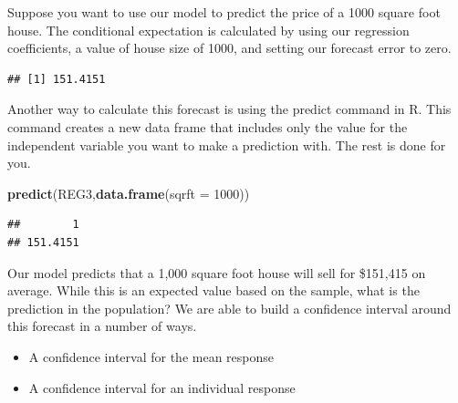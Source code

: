 \documentclass[
]{book}
\newenvironment{Shaded}{\begin{snugshade}}{\end{snugshade}}
\newcommand{\AttributeTok}[1]{\textcolor[rgb]{0.13,0.29,0.53}{#1}}
\newcommand{\DecValTok}[1]{\textcolor[rgb]{0.00,0.00,0.81}{#1}}
\newcommand{\FunctionTok}[1]{\textcolor[rgb]{0.13,0.29,0.53}{\textbf{#1}}}
\newcommand{\NormalTok}[1]{#1}
\newcommand{\OtherTok}[1]{\textcolor[rgb]{0.56,0.35,0.01}{#1}}
\newcommand{\SpecialCharTok}[1]{\textcolor[rgb]{0.81,0.36,0.00}{\textbf{#1}}}
\begin{document}
Suppose you want to use our model to predict the price of a 1000 square foot house. The conditional expectation is calculated by using our regression coefficients, a value of house size of 1000, and setting our forecast error to zero.

\begin{Shaded}
\end{Shaded}

\begin{verbatim}
## [1] 151.4151
\end{verbatim}

Another way to calculate this forecast is using the predict command in R. This command creates a new data frame that includes only the value for the independent variable you want to make a prediction with. The rest is done for you.

\begin{Shaded}
\begin{Highlighting}[]
\FunctionTok{predict}\NormalTok{(REG3,}\FunctionTok{data.frame}\NormalTok{(}\AttributeTok{sqrft =} \DecValTok{1000}\NormalTok{))}
\end{Highlighting}
\end{Shaded}

\begin{verbatim}
##        1 
## 151.4151
\end{verbatim}

Our model predicts that a 1,000 square foot house will sell for \$151,415 on average. While this is an expected value based on the sample, what is the prediction in the population? We are able to build a confidence interval around this forecast in a number of ways.

\begin{itemize}
\item
  A confidence interval for the mean response
\item
  A confidence interval for an individual response
\end{itemize}
\end{document}
